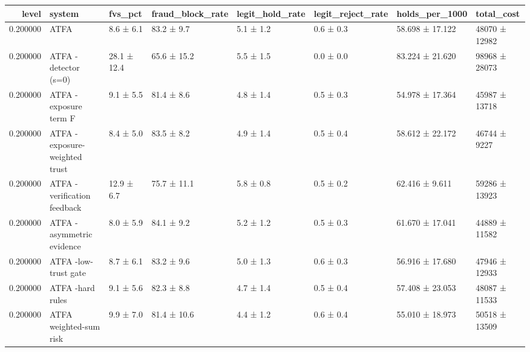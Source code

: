 \begin{tabular}{rlllllll}
\toprule
level & system & fvs\_pct & fraud\_block\_rate & legit\_hold\_rate & legit\_reject\_rate & holds\_per\_1000 & total\_cost \\
\midrule
0.200000 & ATFA & 8.6 ± 6.1 & 83.2 ± 9.7 & 5.1 ± 1.2 & 0.6 ± 0.3 & 58.698 ± 17.122 & 48070 ± 12982 \\
0.200000 & ATFA -detector (s=0) & 28.1 ± 12.4 & 65.6 ± 15.2 & 5.5 ± 1.5 & 0.0 ± 0.0 & 83.224 ± 21.620 & 98968 ± 28073 \\
0.200000 & ATFA -exposure term F & 9.1 ± 5.5 & 81.4 ± 8.6 & 4.8 ± 1.4 & 0.5 ± 0.3 & 54.978 ± 17.364 & 45987 ± 13718 \\
0.200000 & ATFA -exposure-weighted trust & 8.4 ± 5.0 & 83.5 ± 8.2 & 4.9 ± 1.4 & 0.5 ± 0.4 & 58.612 ± 22.172 & 46744 ± 9227 \\
0.200000 & ATFA -verification feedback & 12.9 ± 6.7 & 75.7 ± 11.1 & 5.8 ± 0.8 & 0.5 ± 0.2 & 62.416 ± 9.611 & 59286 ± 13923 \\
0.200000 & ATFA -asymmetric evidence & 8.0 ± 5.9 & 84.1 ± 9.2 & 5.2 ± 1.2 & 0.5 ± 0.3 & 61.670 ± 17.041 & 44889 ± 11582 \\
0.200000 & ATFA -low-trust gate & 8.7 ± 6.1 & 83.2 ± 9.6 & 5.0 ± 1.3 & 0.6 ± 0.3 & 56.916 ± 17.680 & 47946 ± 12933 \\
0.200000 & ATFA -hard rules & 9.1 ± 5.6 & 82.3 ± 8.8 & 4.7 ± 1.4 & 0.5 ± 0.4 & 57.408 ± 23.053 & 48087 ± 11533 \\
0.200000 & ATFA weighted-sum risk & 9.9 ± 7.0 & 81.4 ± 10.6 & 4.4 ± 1.2 & 0.6 ± 0.4 & 55.010 ± 18.973 & 50518 ± 13509 \\
\bottomrule
\end{tabular}
